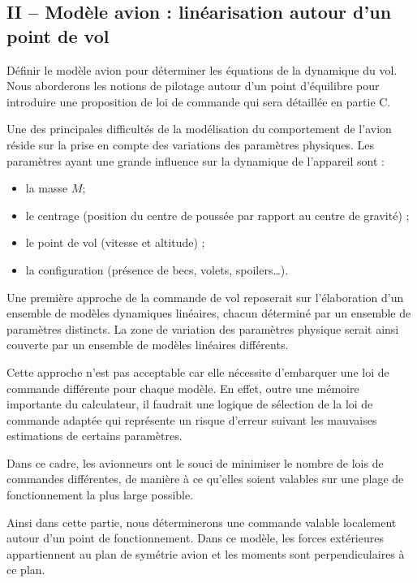 \begin{multicols}{2}
\subsection*{II -- Modèle avion : linéarisation autour d'un point de vol}
\begin{obj}
Définir le modèle avion pour déterminer les équations de la dynamique du vol.
Nous aborderons les notions de pilotage autour d’un point d’équilibre pour introduire une
proposition de loi de commande qui sera détaillée en partie C.
\end{obj}


Une des principales difficultés de la modélisation du comportement de l’avion réside sur la prise en compte
des variations des paramètres physiques. Les paramètres ayant une grande influence sur la dynamique de
l’appareil sont :
\begin{itemize}
\item la masse $M$;
\item le centrage (position du centre de poussée par rapport au centre de gravité) ;
\item le point de vol (vitesse et altitude) ;
\item la configuration (présence de becs, volets, spoilers…).
\end{itemize}

Une première approche de la commande de vol reposerait sur l’élaboration d’un ensemble de modèles
dynamiques linéaires, chacun déterminé par un ensemble de paramètres distincts. La zone de variation
des paramètres physique serait ainsi couverte par un ensemble de modèles linéaires différents.

Cette approche n’est pas acceptable car elle nécessite d’embarquer une loi de commande différente pour
chaque modèle. En effet, outre une mémoire importante du calculateur, il faudrait une logique de sélection
de la loi de commande adaptée qui représente un risque d’erreur suivant les mauvaises estimations de
certains paramètres.

Dans ce cadre, les avionneurs ont le souci de minimiser le nombre de lois de commandes différentes, de
manière à ce qu’elles soient valables sur une plage de fonctionnement la plus large possible.

Ainsi dans cette partie, nous déterminerons une commande valable localement autour d’un point de
fonctionnement.
Dans ce modèle, les forces extérieures appartiennent au plan de symétrie avion et les moments sont
perpendiculaires à ce plan.


\end{multicols}
